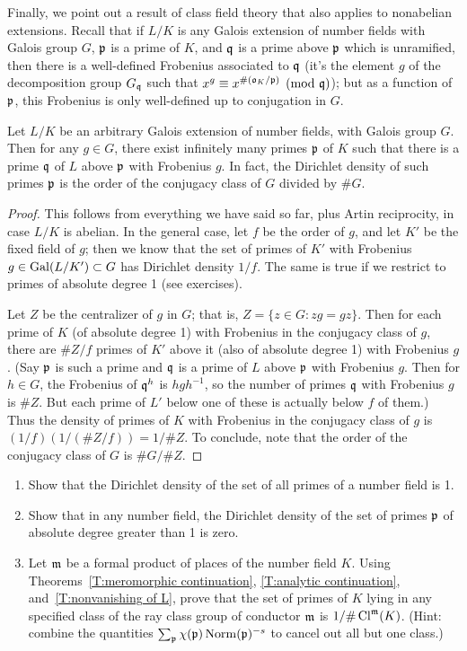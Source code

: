 Finally, we point out a result of class field theory that also applies
to nonabelian extensions. Recall that if $L/K$ is any Galois extension
of number fields with Galois group $G$,
$\mathfrak{p}$ is a prime of $K$, and $\mathfrak{q}$ is a prime
above $\mathfrak{p}$ which is unramified, then there is a well-defined Frobenius
associated to $\mathfrak{q}$ (it's the element $g$ of the decomposition group
$G_{\mathfrak{q}}$ such that $x^g \equiv x^{\#(\mathfrak{o}_K/\mathfrak{p})} \pmod{\mathfrak{q}}$);
but as a function of $\mathfrak{p}$, this Frobenius is only well-defined up
to conjugation in $G$.
\begin{theorem}
Let $L/K$ be an arbitrary Galois extension of number fields,
with Galois group $G$. Then for any $g \in G$, there exist infinitely many
primes $\mathfrak{p}$ of $K$ such that there is a prime $\mathfrak{q}$ of $L$ above
$\mathfrak{p}$ with Frobenius $g$. In fact, the Dirichlet density of such 
primes $\mathfrak{p}$ is the order of the conjugacy class of $G$ divided by
$\#G$.
\end{theorem}
\begin{proof}
This follows from everything we have said so far, plus Artin reciprocity,
in case $L/K$ is abelian. In the general case, let $f$ be the order of
$g$, and let $K'$ be the fixed
field of $g$; then we know that the set of primes of $K'$ with Frobenius
$g \in \operatorname{Gal}(L/K') \subset G$ has Dirichlet density $1/f$. The same is true
if we restrict to primes of absolute degree 1 (see exercises).

Let $Z$ be the centralizer of $g$ in $G$; that is, $Z = \{z \in G:
zg = gz\}$. Then for each prime of $K$ (of absolute degree 1)
with Frobenius in the conjugacy
class of $g$, there are $\#Z/f$ primes of $K'$ above it (also
of absolute degree 1) with Frobenius $g$.
(Say $\mathfrak{p}$ is such a prime and $\mathfrak{q}$ is a prime of $L$ above $\mathfrak{p}$
with Frobenius $g$. Then for $h \in G$, the Frobenius of $\mathfrak{q}^h$
is $hgh^{-1}$, so the number of primes $\mathfrak{q}$ with Frobenius $g$ is
$\#Z$. But each prime of $L'$ below one of these is actually below
$f$ of them.)
Thus the density of primes of $K$ with Frobenius in the conjugacy class
of $g$ is $(1/f)(1/(\#Z/f)) = 1/\#Z$. To conclude, note that the order
of the conjugacy class of $G$ is $\#G/\#Z$.
\end{proof}


\begin{enumerate}
\item
Show that the Dirichlet density of the set of all primes of a
number field is 1.
\item
Show that in any number field,
the Dirichlet density of the set of primes $\mathfrak{p}$ of absolute
degree greater than 1 is zero. 
\item
Let $\mathfrak{m}$ be a formal product of places of the number field $K$.
Using Theorems~\ref{T:meromorphic continuation}, \ref{T:analytic continuation},
 and~\ref{T:nonvanishing of L}, prove that the set of primes of $K$
lying in any specified class of the ray class group of conductor
$\mathfrak{m}$ is $1/\#\operatorname{Cl}^{\mathfrak{m}}(K)$. (Hint: combine the quantities 
$\sum_{\mathfrak{p}} \chi(\mathfrak{p}) \operatorname{Norm}(\mathfrak{p})^{-s}$ to cancel
out all but one class.)
\end{enumerate}

%


